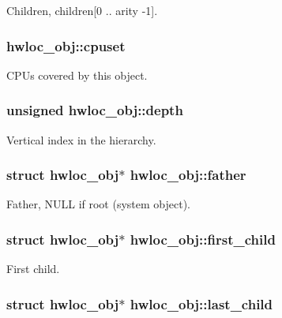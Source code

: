 Children, {\ttfamily children}\mbox{[}0 .. arity -\/1\mbox{]}. \hypertarget{structhwloc__obj_a67925e0f2c47f50408fbdb9bddd0790f}{
\subsubsection[{cpuset}]{ {\bf hwloc\_\-obj::cpuset}}}
\label{structhwloc__obj_a67925e0f2c47f50408fbdb9bddd0790f}


CPUs covered by this object. \hypertarget{structhwloc__obj_a9d82690370275d42d652eccdea5d3ee5}{
\subsubsection[{depth}]{\setlength{\rightskip}{0pt plus 5cm}unsigned {\bf hwloc\_\-obj::depth}}}
\label{structhwloc__obj_a9d82690370275d42d652eccdea5d3ee5}


Vertical index in the hierarchy. \hypertarget{structhwloc__obj_a5fb4d37969f7e132cbd8040df2139dc8}{
\subsubsection[{father}]{\setlength{\rightskip}{0pt plus 5cm}struct {\bf hwloc\_\-obj}$\ast$ {\bf hwloc\_\-obj::father}}}
\label{structhwloc__obj_a5fb4d37969f7e132cbd8040df2139dc8}


Father, {\ttfamily NULL} if root (system object). \hypertarget{structhwloc__obj_af51d08a0a79dba517c06c5afedc8d2dc}{
\subsubsection[{first\_\-child}]{\setlength{\rightskip}{0pt plus 5cm}struct {\bf hwloc\_\-obj}$\ast$ {\bf hwloc\_\-obj::first\_\-child}}}
\label{structhwloc__obj_af51d08a0a79dba517c06c5afedc8d2dc}


First child. \hypertarget{structhwloc__obj_a84bd65634dbc55f4158b74443a9bd04f}{
\subsubsection[{last\_\-child}]{\setlength{\rightskip}{0pt plus 5cm}struct {\bf hwloc\_\-obj}$\ast$ {\bf hwloc\_\-obj::last\_\-child}}}
\label{structhwloc__obj_a84bd65634dbc55f4158b74443a9bd04f}


